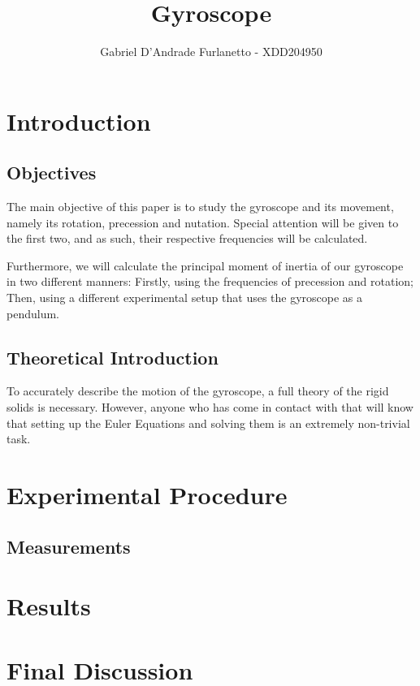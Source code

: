 \documentclass[a4paper,12pt]{article}
\begin{document}
\title{Gyroscope}
\author{Gabriel D'Andrade Furlanetto - XDD204950}
\maketitle
\pagebreak 

\section{Introduction}

\subsection{Objectives}

The main objective of this paper is to study the gyroscope and its movement, namely its rotation, precession and nutation. Special attention will be given to the first two, and as such, their respective frequencies will be calculated.

Furthermore, we will calculate the principal moment of inertia of our gyroscope in two different manners: Firstly, using the frequencies of precession and rotation; Then, using a different experimental setup that uses the gyroscope as a pendulum.

\subsection{Theoretical Introduction}
To accurately describe the motion of the gyroscope, a full theory of the rigid solids is necessary. However, anyone who has come in contact with that will know that setting up the Euler Equations and solving them is an extremely non-trivial task.  

\section{Experimental Procedure}

\subsection{Measurements}

\section{Results}

\section{Final Discussion}
\end{document}
